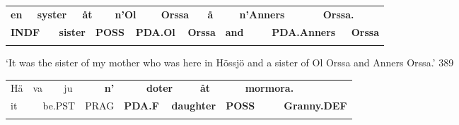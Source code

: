 \begin{tabular}{llllllllllllllll}
\lsptoprule
{\bfseries en} & \multicolumn{2}{l}{{\bfseries syster}

} & \multicolumn{2}{l}{{\bfseries åt}

} & \multicolumn{2}{l}{{\bfseries n’Ol}

} & \multicolumn{2}{l}{{\bfseries Orssa}

} & \multicolumn{2}{l}{{\bfseries å}

} & \multicolumn{2}{l}{{\bfseries n’Anners}

} & \multicolumn{2}{l}{{\bfseries Orssa.}

} & \\
\multicolumn{2}{l}{{\bfseries INDF}

} & \multicolumn{2}{l}{{\bfseries sister }

} & \multicolumn{2}{l}{{\bfseries POSS}

} & \multicolumn{2}{l}{{\bfseries PDA.Ol}

} & \multicolumn{2}{l}{{\bfseries Orssa}

} & \multicolumn{2}{l}{{\bfseries and}

} & \multicolumn{2}{l}{{\bfseries PDA.Anners}

} & \multicolumn{2}{l}{{\bfseries Orssa}

}\\
\lspbottomrule
\end{tabular}

\begin{styleTranslation}
‘It was the sister of my mother who was here in Hössjö and a sister of Ol Orssa and Anners Orssa.’ 389

\end{styleTranslation}

\begin{tabular}{llllllllllllll}
\lsptoprule
Hä & \multicolumn{2}{l}{va

} & \multicolumn{2}{l}{ju

} & \multicolumn{2}{l}{{\bfseries n’}

} & \multicolumn{2}{l}{{\bfseries doter}

} & \multicolumn{2}{l}{{\bfseries åt}

} & \multicolumn{2}{l}{{\bfseries mormora.}

} & \\
\multicolumn{2}{l}{it

} & \multicolumn{2}{l}{be.PST

} & \multicolumn{2}{l}{PRAG

} & \multicolumn{2}{l}{{\bfseries PDA.F}

} & \multicolumn{2}{l}{{\bfseries daughter}

} & \multicolumn{2}{l}{{\bfseries POSS}

} & \multicolumn{2}{l}{{\bfseries Granny.DEF}

}\\
\lspbottomrule
\end{tabular}

